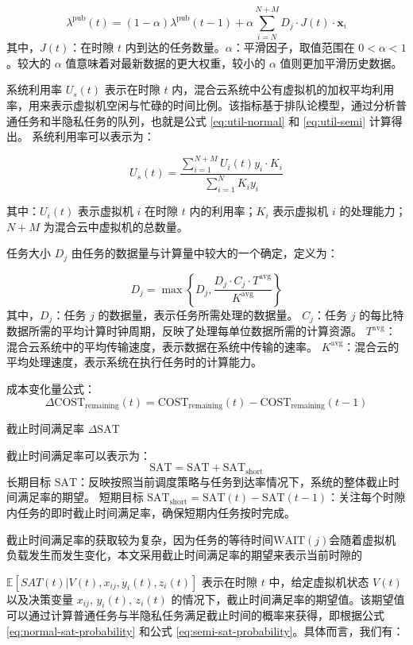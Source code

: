 \begin{equation}
    \lambda^{\text{pub}}(t) = (1 - \alpha) \lambda^{\text{pub}}(t-1) + \alpha \sum_{i=N}^{N+M} D_j \cdot J(t) \cdot \mathbf{x}_i
    \label{eq:pub-arrival-ewa}
\end{equation}
其中，\(J(t)\)：在时隙 \(t\) 内到达的任务数量。\(\alpha\)：平滑因子，取值范围在 \(0 < \alpha < 1\)。较大的 \(\alpha\) 值意味着对最新数据的更大权重，较小的 \(\alpha\) 值则更加平滑历史数据。

系统利用率 \(U_s(t)\) 表示在时隙 \(t\) 内，混合云系统中公有虚拟机的加权平均利用率，用来表示虚拟机空闲与忙碌的时间比例。该指标基于排队论模型，通过分析普通任务和半隐私任务的队列，也就是公式 \eqref{eq:util-normal} 和 \eqref{eq:util-semi} 计算得出。
系统利用率可以表示为：

\[
    U_s(t) = \frac{\sum_{i=1}^{N+M} U_i(t) y_i \cdot K_i}{\sum_{i=1}^{N} K_i y_i}
\]

其中：\(U_i(t)\) 表示虚拟机 \(i\) 在时隙 \(t\) 内的利用率；\(K_i\) 表示虚拟机 \(i\) 的处理能力；\(N+M\) 为混合云中虚拟机的总数量。

任务大小 \(D_j\) 由任务的数据量与计算量中较大的一个确定，定义为：

\[
    D_j = \max \left\{ D_j, \frac{D_j \cdot C_j \cdot T^{\text{avg}}}{K^{\text{avg}}} \right\}
\]
其中，\(D_j\)：任务 \(j\) 的数据量，表示任务所需处理的数据量。
\(C_j\)：任务 \(j\) 的每比特数据所需的平均计算时钟周期，反映了处理每单位数据所需的计算资源。
\(T^{\text{avg}}\)：混合云系统中的平均传输速度，表示数据在系统中传输的速率。
\(K^{\text{avg}}\)：混合云的平均处理速度，表示系统在执行任务时的计算能力。

成本变化量公式：
\[
    \Delta \text{COST}_{\text{remaining}}(t) = \text{COST}_{\text{remaining}}(t) - \text{COST}_{\text{remaining}}(t-1)
\]

截止时间满足率 \(\Delta \text{SAT}\)

截止时间满足率可以表示为：
\[
    \text{SAT} = \text{SAT} + \text{SAT}_{\text{short}}
\]
长期目标 \(\text{SAT}\)：反映按照当前调度策略与任务到达率情况下，系统的整体截止时间满足率的期望。
短期目标 \(\text{SAT}_{\text{short}} = \text{SAT}(t) - \text{SAT}(t-1)\)：关注每个时隙内任务的即时截止时间满足率，确保短期内任务按时完成。

截止时间满足率的获取较为复杂，因为任务的等待时间$\text{WAIT}(j)$会随着虚拟机负载发生而发生变化，本文采用截止时间满足率的期望来表示当前时隙的

$\mathbb{E} [SAT(t) | V(t), x_{ij}, y_i(t), z_i(t)]$ 表示在时隙 $t$ 中，给定虚拟机状态 $V(t)$ 以及决策变量 $x_{ij}$, $y_i(t)$, $z_i(t)$ 的情况下，截止时间满足率的期望值。该期望值可以通过计算普通任务与半隐私任务满足截止时间的概率来获得，即根据公式 \eqref{eq:normal-sat-probability} 和公式 \eqref{eq:semi-sat-probability}。具体而言，我们有：

